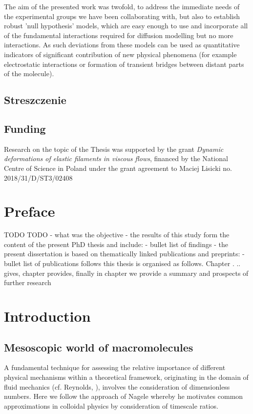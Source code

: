 \documentclass{doctoral}
\begin{document}
The aim of the presented work was twofold, to address the immediate needs of the experimental groups we have been collaborating with, but also to establish robust 'null hypothesis' models, which are easy enough to use and incorporate all of the fundamental interactions required for diffusion modelling but no more interactions.
As such deviations from these models can be used as quantitative indicators of significant contribution of new physical phenomena (for example electrostatic interactions or formation of transient bridges between distant parts of the molecule).
\clearpage

\section*{Streszczenie}

\clearpage

\section*{Funding}
Research on the topic of the Thesis was supported by the grant \emph{Dynamic deformations of elastic filaments in viscous flows}, financed by the National Centre of Science in Poland under the grant agreement to Maciej Lisicki no.
2018/31/D/ST3/02408
\clearpage

\tableofcontents

\chapter*{Preface}

TODO TODO - what was the objective - the results of this study form the content of the present PhD thesis and include: - bullet list of findings - the present dissertation is based on thematically linked publications and preprints: - bullet list of publications follows this thesis is organised as follows.
Chapter .
.. gives, chapter provides, finally in chapter we provide a summary and prospects of further research

\chapter{Introduction}

\section{Mesoscopic world of macromolecules}

A fundamental technique for assessing the relative importance of different physical mechanisms within a theoretical framework, originating in the domain of fluid mechanics (cf.
Reynolds, \cite{Reynolds_1883}), involves the consideration of dimensionless numbers.
Here we follow the approach of Nagele \cite{Nagele_2013} whereby he motivates common approximations in colloidal physics by consideration of timescale ratios.
\end{document}
